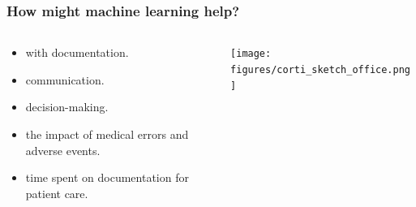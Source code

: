 \begin{frame}
    \frametitle{How might machine learning help?}
    \begin{columns}
        \begin{column}{0.35\textwidth}
            \begin{itemize}
                \item <1->  with documentation.
                \item <1->  communication.
                \item <1->  decision-making.
                \vspace{1em}
                \item <2->  the impact of medical errors and adverse events.
                \item <2->  time spent on documentation for patient care.
            \end{itemize}
        \end{column}
        \begin{column}{0.65\textwidth}
            \centering
            \texttt{[image: figures/corti\_sketch\_office.png]}
        \end{column}
    \end{columns}

\end{frame}


